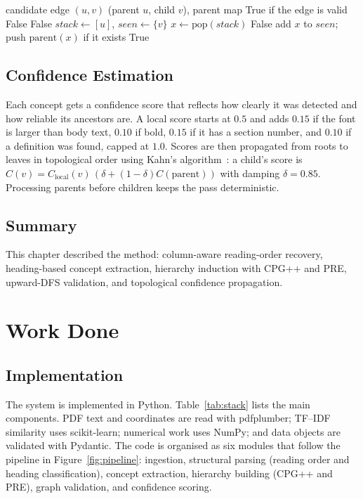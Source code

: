 \documentclass[12pt,a4paper]{report}
\begin{document}
\begin{algorithm}[!htbp]
\caption{Upward DFS Cycle and Depth Check}
\label{alg:dfs}
\begin{algorithmic}[1]
\REQUIRE candidate edge $(u,v)$ (parent $u$, child $v$), parent map
\ENSURE True if the edge is valid
 \RETURN False \ENDIF
{} \RETURN False \ENDIF
\STATE $stack \leftarrow [u]$, $seen \leftarrow \{v\}$
  \STATE $x \leftarrow \text{pop}(stack)$
   \RETURN False  \ENDIF
   \STATE add $x$ to $seen$; push $\text{parent}(x)$ if it exists \ENDIF
\ENDWHILE
\RETURN True
\end{algorithmic}
\end{algorithm}

\section{Confidence Estimation}
Each concept gets a confidence score that reflects how clearly it was detected and how
reliable its ancestors are. A local score starts at $0.5$ and adds $0.15$ if the font is
larger than body text, $0.10$ if bold, $0.15$ if it has a section number, and $0.10$ if
a definition was found, capped at $1.0$. Scores are then propagated from roots to leaves
in topological order using Kahn's algorithm~\cite{kahn1962topological}: a child's score
is $C(v)=C_{\text{local}}(v)\,(\delta+(1-\delta)C(\text{parent}))$ with damping
$\delta=0.85$. Processing parents before children keeps the pass deterministic.

\section{Summary}
This chapter described the method: column-aware reading-order recovery, heading-based
concept extraction, hierarchy induction with CPG++ and PRE, upward-DFS validation, and
topological confidence propagation.

\chapter{Work Done}

\section{Implementation}
The system is implemented in Python. Table~\ref{tab:stack} lists the main components.
PDF text and coordinates are read with pdfplumber; TF--IDF similarity uses
scikit-learn; numerical work uses NumPy; and data objects are validated with Pydantic.
The code is organised as six modules that follow the pipeline in Figure~\ref{fig:pipeline}:
ingestion, structural parsing (reading order and heading classification), concept
extraction, hierarchy building (CPG++ and PRE), graph validation, and confidence
scoring.
\end{document}
